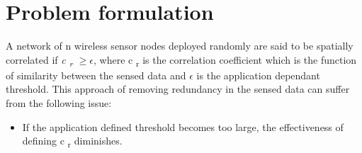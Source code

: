 \section{Problem formulation}
A network of n wireless sensor nodes deployed randomly are said to be spatially correlated if \textit{c \textsubscript {r} $\geq \epsilon $}, where c \textsubscript {r} is the correlation coefficient which is the function of similarity between the sensed data and $\epsilon$ is the application dependant threshold. This approach of removing redundancy in the sensed data can suffer from the following issue:
\begin{itemize}
    \item If the application defined threshold becomes too large, the effectiveness of defining c \textsubscript {r} diminishes.
\end{itemize}
